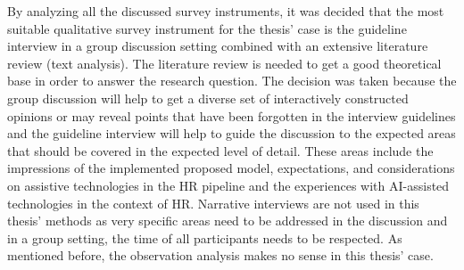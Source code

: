 \documentclass[draft,final]{thesisclass} %
\begin{document}
By analyzing all the discussed survey instruments, it was decided that the most suitable qualitative survey instrument for the thesis' case is the guideline interview in a group discussion setting combined with an extensive literature review (text analysis).
The literature review is needed to get a good theoretical base in order to answer the research question.
The decision was taken because the group discussion will help to get a diverse set of interactively constructed opinions or may reveal points that have been forgotten in the interview guidelines and the guideline interview will help to guide the discussion to the expected areas that should be covered in the expected level of detail.
These areas include the impressions of the implemented proposed model, expectations, and considerations on assistive technologies in the \acs{HR} pipeline and the experiences with \acs{AI}-assisted technologies in the context of \acs{HR}.
Narrative interviews are not used in this thesis' methods as very specific areas need to be addressed in the discussion and in a group setting, the time of all participants needs to be respected.
As mentioned before, the observation analysis makes no sense in this thesis' case.
\end{document}
